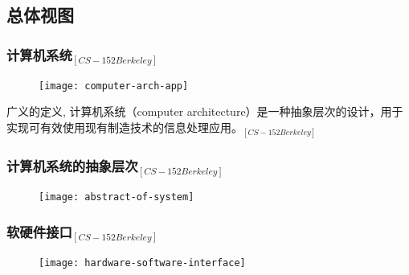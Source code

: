 

\subsection{总体视图} 

\begin{frame}
    
    \frametitle{{计算机系统$_{[CS-152 Berkeley]}$}}
    
    \begin{figure}
        \centering
        \texttt{[image: computer-arch-app]}
    \end{figure}
    \pause
    
    广义的定义, 计算机系统（computer architecture）是一种抽象层次的设计，用于实现可有效使用现有制造技术的信息处理应用。$_{[CS-152 Berkeley]}$
\end{frame}


\begin{frame}
    
    \frametitle{{计算机系统的抽象层次$ _{[CS-152 Berkeley]} $}}
    
    \begin{figure}
        \centering
        \texttt{[image: abstract-of-system]}
    \end{figure}
    
\end{frame}


\begin{frame}[plain]
    
    \frametitle{{软硬件接口$ _{[CS-152 Berkeley]} $}}
    \begin{figure}
        \centering
        \texttt{[image: hardware-software-interface]}
    \end{figure}
    
    
\end{frame}

